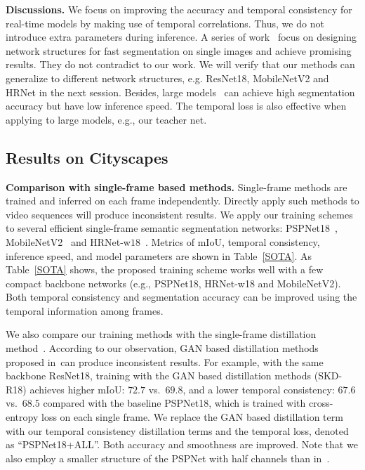 \documentclass[runningheads]{llncs}
\begin{document}
\noindent \textbf{Discussions.}
We focus on improving the accuracy and temporal consistency for real-time models by making use of temporal correlations. Thus, we do not introduce extra parameters during inference. A series of work~\cite{zhao2017icnet,yu2018bisenet,orsic2019defense} focus on designing network structures for fast segmentation on single images and achieve promising results. They do not contradict to our work. We will verify that our methods can generalize to different network structures, e.g. ResNet18, MobileNetV2 and HRNet in the next session. Besides, large models~\cite{zhao2017pyramid,zhu2019improving} can achieve high segmentation accuracy but have low inference speed. The temporal loss is also effective when applying to large models, e.g., our teacher net.

\subsection{Results on Cityscapes}

\noindent\textbf{Comparison with single-frame based methods.}
Single-frame methods are trained and inferred on each frame independently. Directly apply such methods to video sequences will produce inconsistent results. We apply our training schemes to several efficient single-frame semantic segmentation networks: PSPNet18~\cite{zhao2017pyramid}, MobileNetV2~\cite{Sandler2018MobileNetV2IR} and HRNet-w$18$~\cite{SunZJCXLMWLW19,SunXLW19}.
Metrics of
mIoU, temporal consistency, inference speed, and model parameters are shown in Table~\ref{SOTA}.  As Table~\ref{SOTA} shows, the proposed training scheme
works well with a few
compact backbone networks (e.g., PSPNet18, HRNet-w18 and MobileNetV2). Both temporal consistency and segmentation accuracy can be improved
using
the temporal information among frames.

We also compare our training methods with the single-frame distillation method~\cite{liu2019structured}. According to our observation, GAN based distillation methods proposed in~\cite{liu2019structured}can
produce inconsistent results. For example, with the same backbone ResNet18, training with the GAN based distillation methods (SKD-R18)
achieves higher mIoU: $72.7$ vs.\  $69.8$, and a lower temporal consistency: $67.6$ vs.\  $68.5$ compared with the baseline PSPNet18, which is trained with cross-entropy loss on each single frame.
We replace the GAN based distillation term with our temporal consistency distillation terms and the temporal loss,
denoted as ``PSPNet18+ALL''. Both accuracy and smoothness are improved. Note that we also employ a smaller structure of the PSPNet with half channels than in~\cite{liu2019structured}.
\end{document}
